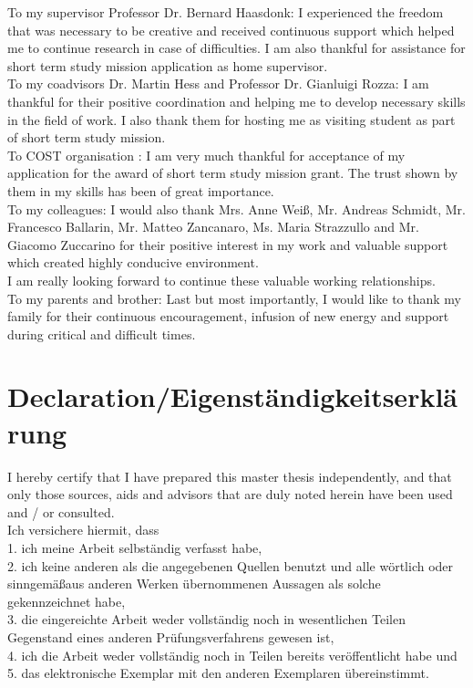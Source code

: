 \documentclass[a4paper,twoside,openright]{book}
\begin{document}
To my supervisor Professor Dr. Bernard Haasdonk: I experienced the freedom that was necessary to be creative and received continuous support which helped me to continue research in case of difficulties. I am also thankful for assistance for short term study mission application as home supervisor.\\

To my coadvisors Dr. Martin Hess and Professor Dr. Gianluigi Rozza: I am thankful for their positive coordination and helping me to develop necessary skills in the field of work. I also thank them for hosting me as visiting student as part of short term study mission.\\

To COST organisation : I am very much thankful for acceptance of my application for the award of short term study mission grant. The trust shown by them in my skills has been of great importance.\\

To my colleagues: I would also thank Mrs. Anne Wei\ss, Mr. Andreas Schmidt, Mr. Francesco Ballarin, Mr. Matteo Zancanaro, Ms. Maria Strazzullo and Mr. Giacomo Zuccarino for their positive interest in my work and valuable support which created highly conducive environment.\\

I am really looking forward to continue these valuable working relationships.\\

To my parents and brother: Last but most importantly, I would like to thank my family for their continuous encouragement, infusion of new energy and support during critical and difficult times.\\

\newpage

\section{Declaration/Eigenst\"andigkeitserkl\"arung}

I hereby certify that I have prepared this master thesis independently, and that only those sources, aids and advisors that are duly noted herein have been used and / or consulted.\\

\noindent
Ich versichere hiermit, dass\\
1. ich meine Arbeit selbst\"andig verfasst habe,\\
2. ich keine anderen als die angegebenen Quellen benutzt und alle w\"ortlich oder
sinngem\"a\ss \space aus anderen Werken \"ubernommenen Aussagen als solche gekennzeichnet habe,\\
3. die eingereichte Arbeit weder vollst\"andig noch in wesentlichen Teilen
Gegenstand eines anderen Prüfungsverfahrens gewesen ist,\\
4. ich die Arbeit weder vollst\"andig noch in Teilen bereits veröffentlicht habe und\\
5. das elektronische Exemplar mit den anderen Exemplaren \"ubereinstimmt.\\
\end{document}

